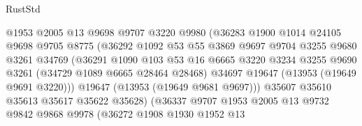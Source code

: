 \begin{lexlean}{RustStd}
\begin{coremodule}
                                @1953
                                @2005
                                @13
                                @9698
                                @9707
                                @3220
                                @9980
                                (@36283
                                  @1900
                                  @1014
                                  @24105
                                  @9698
                                  @9705
                                  @8775
                                  (@36292
                                    @1092
                                    @53
                                    @55
                                    @3869
                                    @9697
                                    @9704
                                    @3255
                                    @9680
                                    @3261
                                    @34769
                                    (@36291
                                      @1090
                                      @103
                                      @53
                                      @16
                                      @6665
                                      @3220
                                      @3234
                                      @3255
                                      @9690
                                      @3261
                                      (@34729 @1089 @6665 @28464 @28468)
                                      @34697
                                      @19647
                                      (@13953 (@19649 @9691 @3220)))
                                    @19647
                                    (@13953 (@19649 @9681 @9697)))
                                  @35607
                                  @35610
                                  @35613
                                  @35617
                                  @35622
                                  @35628)
                                (@36337
                                  @9707
                                  @1953
                                  @2005
                                  @13
                                  @9732
                                  @9842
                                  @9868
                                  @9978
                                  (@36272
                                    @1908
                                    @1930
                                    @1952
                                    @13

\end{coremodule}
\end{lexlean}
